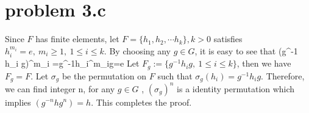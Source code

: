 \documentclass[12pt]{iopart}
\begin{document}
\section{problem 3.c}
Since $F$ has finite elements, let $F=\{h_1,h_2,\cdots h_k\},k>0$ satisfies $h_i^{m_i}=e, \ m_i\geq1, \ 1\leq i\leq k$. By choosing any $g\in G$, it is easy to see that 
\ben
(g^{-1} h_i g)^{m_i} =g^{-1}h_i^{m_i}g=e
\een
Let $F_g:=\{g^{-1}h_i g , \ 1\leq i\leq k\}$, then we have $F_g=F$. Let $\sigma_g $ be the permutation on $F$ such that $\sigma_g(h_i)=g^{-1}h_i g$. Therefore, we can find integer n, for any $g\in G$ , $(\sigma_g)^n$ is a identity permutation which implies $(g^{-n}hg^n)=h$. This completes the proof.
\end{document}
